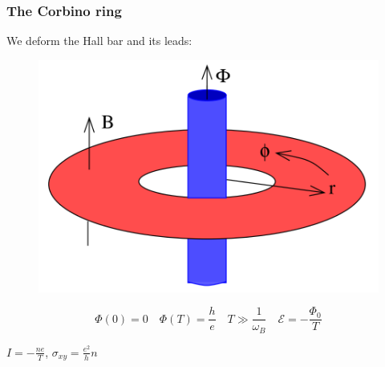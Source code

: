 \documentclass{beamer}
\begin{document}
\begin{frame}
\frametitle{The Corbino ring}
\begin{center}

We deform the Hall bar and its leads:

\begin{figure}[!htb]
\centering
\includegraphics[scale=0.2]{corbino.png}
\end{figure}

\[
\Phi(0) = 0 \quad \Phi (T) = \frac{h}{e} \quad T \gg \frac{1}{\omega_B} \quad \mathcal{E} = -\frac{\Phi_0}{T}
\]


$I = - \frac{ne}{T}$, $\sigma_{xy} = \frac{e^2}{h} n$

\end{center}
\end{frame}
\end{document}
